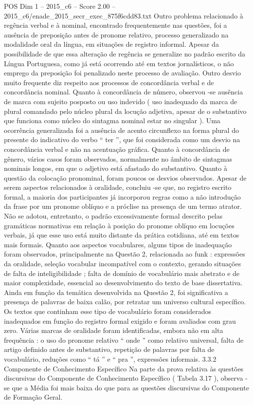 \begin{textsample}{POS Dim 1 – 2015\_c6 – Score 2.00 – 2015\_c6/enade\_2015\_secr\_exec\_875f6cdd83.txt}
Outro problema relacionado à regência verbal e à nominal, encontrado frequentemente nas questões, foi a ausência de preposição antes de pronome relativo, processo generalizado na modalidade oral da língua, em situações de registro informal.
Apesar da possibilidade de que essa alteração de regência se generalize no padrão escrito da Língua Portuguesa, como já está ocorrendo até em textos jornalísticos, o não emprego da preposição foi penalizado neste processo de avaliação.
Outro desvio muito frequente diz respeito aos processos de concordância verbal e de concordância nominal.
Quanto à concordância de número, observou -se ausência de marca com sujeito posposto ou uso indevido ( uso inadequado da marca de plural comandado pelo núcleo plural da locução adjetiva, apesar de o substantivo que funciona como núcleo do sintagma nominal estar no singular ).
Uma ocorrência generalizada foi a ausência de acento circunflexo na forma plural do presente do indicativo do verbo “ ter ”, que foi considerada como um desvio na concordância verbal e não na acentuação gráfica.
Quanto à concordância de gênero, vários casos foram observados, normalmente no âmbito de sintagmas nominais longos, em que o adjetivo está afastado do substantivo.
Quanto à questão da colocação pronominal, foram poucos os desvios observados.
Apesar de serem aspectos relacionados à oralidade, concluiu -se que, no registro escrito formal, a maioria dos participantes já incorporou regras como a não introdução da frase por um pronome oblíquo e a próclise na presença de um termo atrator.
Não se adotou, entretanto, o padrão excessivamente formal descrito pelas gramáticas normativas em relação à posição do pronome oblíquo em locuções verbais, já que esse uso está muito distante da prática cotidiana, até em textos mais formais.
Quanto aos aspectos vocabulares, alguns tipos de inadequação foram observados, principalmente na Questão 2, relacionada ao funk : expressões da oralidade, seleção vocabular incompatível com o contexto, gerando situações de falta de inteligibilidade ; falta de domínio de vocabulário mais abstrato e de maior complexidade, essencial ao desenvolvimento do texto de base dissertativa.
Ainda em função da temática desenvolvida na Questão 2, foi significativa a presença de palavras de baixa calão, por retratar um universo cultural específico.
Os textos que continham esse tipo de vocabulário foram considerados inadequados em função do registro formal exigido e foram avaliados com grau zero.
Várias marcas de oralidade foram identificadas, embora não em alta frequência : o uso do pronome relativo “ onde ” como relativo universal, falta de artigo definido antes de substantivo, repetição de palavras por falta de vocabulário, reduções como “ tá ” e “ pra ”, expressões informais. 3.3.2 Componente de Conhecimento Específico Na parte da prova relativa às questões discursivas do Componente de Conhecimento Específico ( Tabela 3.17 ), observa -se que a Média foi mais baixa do que para as questões discursivas do Componente de Formação Geral.

\end{textsample}
